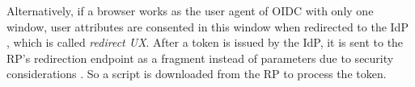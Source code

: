 
Alternatively, if a browser works as the user agent of OIDC with only one window,
        user attributes are consented in this window when redirected to the IdP \cite{OpenIDConnect,rfc6749,GoogleIdIntegrate}, 
        which is called \emph{redirect UX}.
After a token is issued by the IdP,
    it is sent to the RP's redirection endpoint as a fragment instead of parameters due to security considerations \cite{de2014oauth}.
So a script is downloaded from the RP to process the token.

\begin{table*}[tb]
    \caption{Privacy-preserving solutions of SSO and identity federation}
\end{table*}
